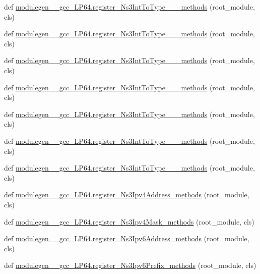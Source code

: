\begin{DoxyCompactItemize}
\item 
def \hyperlink{namespacemodulegen____gcc__LP64_a2d21ad572ae98faab853692f4d8487c4}{modulegen\+\_\+\+\_\+gcc\+\_\+\+L\+P64.\+register\+\_\+\+Ns3\+Int\+To\+Type\+\_\+\+\_\+\_\+methods} (root\+\_\+module, cls)
\item 
def \hyperlink{namespacemodulegen____gcc__LP64_a2f696a0bf693c63b1359996f5d5e686a}{modulegen\+\_\+\+\_\+gcc\+\_\+\+L\+P64.\+register\+\_\+\+Ns3\+Int\+To\+Type\+\_\+\+\_\+\_\+methods} (root\+\_\+module, cls)
\item 
def \hyperlink{namespacemodulegen____gcc__LP64_aa3d1727bfe3d299ca149d2d9292da720}{modulegen\+\_\+\+\_\+gcc\+\_\+\+L\+P64.\+register\+\_\+\+Ns3\+Int\+To\+Type\+\_\+\+\_\+\_\+methods} (root\+\_\+module, cls)
\item 
def \hyperlink{namespacemodulegen____gcc__LP64_a9255f00dc66e5a24d1153402ea666159}{modulegen\+\_\+\+\_\+gcc\+\_\+\+L\+P64.\+register\+\_\+\+Ns3\+Int\+To\+Type\+\_\+\+\_\+\_\+methods} (root\+\_\+module, cls)
\item 
def \hyperlink{namespacemodulegen____gcc__LP64_a0b204806fb355ce5f61f4196390bd734}{modulegen\+\_\+\+\_\+gcc\+\_\+\+L\+P64.\+register\+\_\+\+Ns3\+Int\+To\+Type\+\_\+\+\_\+\_\+methods} (root\+\_\+module, cls)
\item 
def \hyperlink{namespacemodulegen____gcc__LP64_acf85e6b9c3cfb8f25f485b16d81a7298}{modulegen\+\_\+\+\_\+gcc\+\_\+\+L\+P64.\+register\+\_\+\+Ns3\+Int\+To\+Type\+\_\+\+\_\+\_\+methods} (root\+\_\+module, cls)
\item 
def \hyperlink{namespacemodulegen____gcc__LP64_a537be33d9859e391f1c72275c2a3e931}{modulegen\+\_\+\+\_\+gcc\+\_\+\+L\+P64.\+register\+\_\+\+Ns3\+Int\+To\+Type\+\_\+\+\_\+\_\+methods} (root\+\_\+module, cls)
\item 
def \hyperlink{namespacemodulegen____gcc__LP64_a52c7eb3519820103a7ff4aaf269a6c89}{modulegen\+\_\+\+\_\+gcc\+\_\+\+L\+P64.\+register\+\_\+\+Ns3\+Ipv4\+Address\+\_\+methods} (root\+\_\+module, cls)
\item 
def \hyperlink{namespacemodulegen____gcc__LP64_abfab99a01a92901ea710a50ce313c67c}{modulegen\+\_\+\+\_\+gcc\+\_\+\+L\+P64.\+register\+\_\+\+Ns3\+Ipv4\+Mask\+\_\+methods} (root\+\_\+module, cls)
\item 
def \hyperlink{namespacemodulegen____gcc__LP64_adadace4a2a2a7b40dbbc479c719515d9}{modulegen\+\_\+\+\_\+gcc\+\_\+\+L\+P64.\+register\+\_\+\+Ns3\+Ipv6\+Address\+\_\+methods} (root\+\_\+module, cls)
\item 
def \hyperlink{namespacemodulegen____gcc__LP64_aabc084fc7c70fffda3389dc15cd95031}{modulegen\+\_\+\+\_\+gcc\+\_\+\+L\+P64.\+register\+\_\+\+Ns3\+Ipv6\+Prefix\+\_\+methods} (root\+\_\+module, cls)

\end{DoxyCompactItemize}
